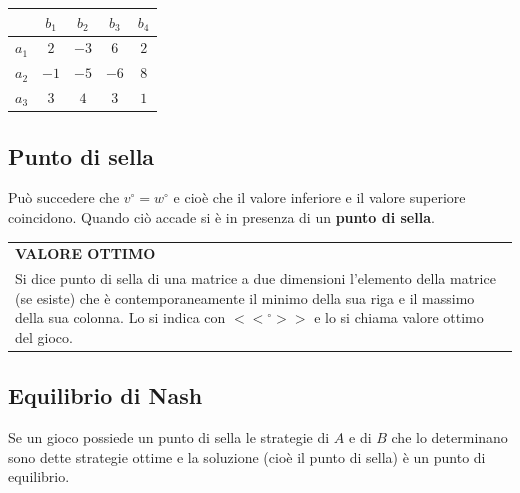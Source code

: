 \documentclass[a4paper]{extarticle}
\renewcommand\arraystretch{}
\begin{document}
\vspace{1em}
\noindent
\begin{table}[H]
    \setlength{\tabcolsep}{8pt}
    \renewcommand{\arraystretch}{1.5}
    \noindent
    \centering
    \begin{tabular}{|c|cccc|}
        \hline
         & $b_1$ & $b_2$ & $b_3$ & $b_4$\\
        \hline
        $a_1$ & $2$ & $-3$ & $6$ & $2$\\
        $a_2$ & $-1$ & $-5$ & $-6$ & $8$\\
        $a_3$ & $3$ & $4$ & $3$ & $1$\\
        \hline
    \end{tabular}
\end{table}

\vspace{1em}
\subsection{Punto di sella}
Può succedere che $v^\circ=w^\circ$ e cioè che il valore inferiore e il valore superiore coincidono. Quando ciò accade si è in presenza di un \textbf{punto di sella}.

\vspace{1em}
\setlength{\tabcolsep}{14pt}
\renewcommand{\arraystretch}{2}
\noindent
\begin{tabularx}{\textwidth}{@{}|P|@{}}
    \hline
    {\textbf{VALORE OTTIMO}}\\
    \parbox{\linewidth}{Si dice punto di sella di una matrice a due dimensioni l'elemento della matrice (se esiste) che è contemporaneamente il minimo della sua riga e il massimo della sua colonna. Lo si indica con $<<{^\circ}>>$ e lo si chiama valore ottimo del gioco.\vspace{3mm}}\\
    \hline
\end{tabularx}

\vspace{1em}
\subsection{Equilibrio di Nash}
Se un gioco possiede un punto di sella le strategie di $A$ e di $B$ che lo determinano sono dette strategie ottime e la soluzione (cioè il punto di sella) è un punto di equilibrio.
\end{document}
